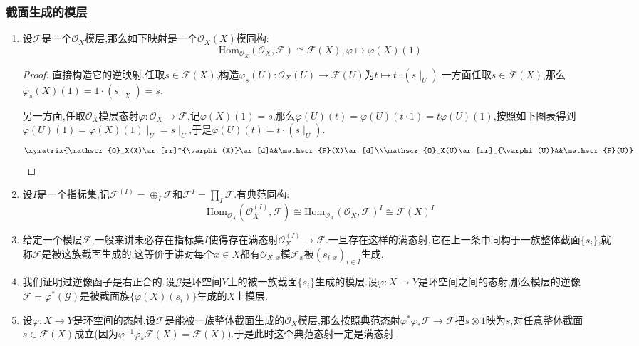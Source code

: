 \subsubsection{截面生成的模层}
\begin{enumerate}
	\item 设$\mathscr{F}$是一个$\mathscr{O}_X$模层,那么如下映射是一个$\mathscr{O}_X(X)$模同构:
	$$\mathrm{Hom}_{\mathscr{O}_X}(\mathscr{O}_X,\mathscr{F})\cong\mathscr{F}(X),\varphi\mapsto\varphi(X)(1)$$
	\begin{proof}
		
		直接构造它的逆映射.任取$s\in\mathscr{F}(X)$,构造$\varphi_s(U):\mathscr{O}_X(U)\to\mathscr{F}(U)$为$t\mapsto t\cdot(s\mid_U)$.一方面任取$s\in\mathscr{F}(X)$,那么$\varphi_s(X)(1)=1\cdot(s\mid_X)=s$.
		
		另一方面,任取$\mathscr{O}_X$模层态射$\varphi:\mathscr{O}_X\to\mathscr{F}$,记$\varphi(X)(1)=s$,那么$\varphi(U)(t)=\varphi(U)(t\cdot1)=t\varphi(U)(1)$,按照如下图表得到$\varphi(U)(1)=\varphi(X)(1)\mid_U=s\mid_U$,于是$\varphi(U)(t)=t\cdot(s\mid_U)$.
		$$\xymatrix{\mathscr{O}_X(X)\ar[rr]^{\varphi(X)}\ar[d]&&\mathscr{F}(X)\ar[d]\\\mathscr{O}_X(U)\ar[rr]_{\varphi(U)}&&\mathscr{F}(U)}$$
	\end{proof}
	\item 设$I$是一个指标集,记$\mathscr{F}^{(I)}=\oplus_{I}\mathscr{F}$和$\mathscr{F}^I=\prod_I\mathscr{F}$.有典范同构:
	$$\mathrm{Hom}_{\mathscr{O}_X}(\mathscr{O}_X^{(I)},\mathscr{F})\cong\mathrm{Hom}_{\mathscr{O_X}}(\mathscr{O}_X,\mathscr{F})^I\cong\mathscr{F}(X)^I$$
	\item 给定一个模层$\mathscr{F}$,一般来讲未必存在指标集$I$使得存在满态射$\mathscr{O}_X^{(I)}\to\mathscr{F}$.一旦存在这样的满态射,它在上一条中同构于一族整体截面$\{s_i\}$,就称$\mathscr{F}$是被这族截面生成的.这等价于讲对每个$x\in X$都有$\mathscr{O}_{X,x}$模$\mathscr{F}_x$被$(s_{i,x})_{i\in I}$生成.
	\item 我们证明过逆像函子是右正合的.设$\mathscr{G}$是环空间$Y$上的被一族截面$\{s_i\}$生成的模层.设$\varphi:X\to Y$是环空间之间的态射,那么模层的逆像$\mathscr{F}=\varphi^*(\mathscr{G})$是被截面族$\{\varphi(X)(s_i)\}$生成的$X$上模层.
	\item 设$\varphi:X\to Y$是环空间的态射,设$\mathscr{F}$是能被一族整体截面生成的$\mathscr{O}_X$模层,那么按照典范态射$\varphi^*\varphi_*\mathscr{F}\to\mathscr{F}$把$s\otimes1$映为$s$,对任意整体截面$s\in\mathscr{F}(X)$成立(因为$\varphi^{-1}\varphi_*\mathscr{F}(X)=\mathscr{F}(X)$).于是此时这个典范态射一定是满态射.
\end{enumerate}
